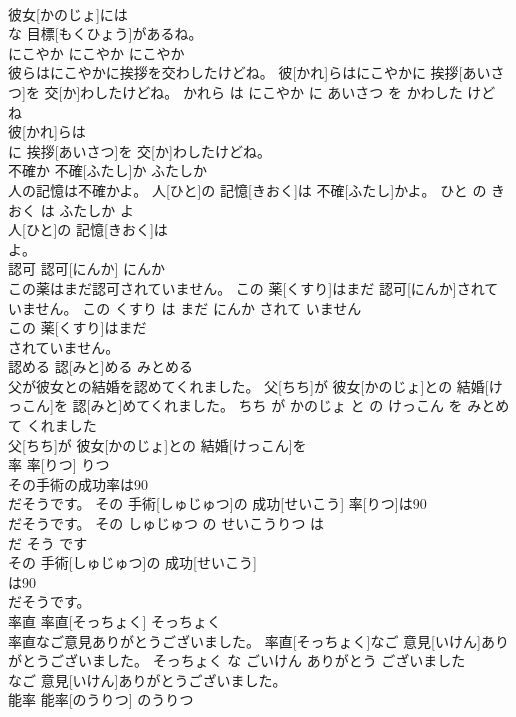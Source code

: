 \documentclass[8pt]{extreport}
\begin{document}
\begin{CJK}{UTF8}{min}
\\	彼女[かのじょ]には
\\	な 目標[もくひょう]があるね。			
\\	にこやか	にこやか	にこやか	
\\	彼らはにこやかに挨拶を交わしたけどね。	彼[かれ]らはにこやかに 挨拶[あいさつ]を 交[か]わしたけどね。	かれら は にこやか に あいさつ を かわした けど ね	
\\	彼[かれ]らは
\\	に 挨拶[あいさつ]を 交[か]わしたけどね。			
\\	不確か	不確[ふたし]か	ふたしか	
\\	人の記憶は不確かよ。	人[ひと]の 記憶[きおく]は 不確[ふたし]かよ。	ひと の きおく は ふたしか よ	
\\	人[ひと]の 記憶[きおく]は
\\	よ。			
\\	認可	認可[にんか]	にんか	
\\	この薬はまだ認可されていません。	この 薬[くすり]はまだ 認可[にんか]されていません。	この くすり は まだ にんか されて いません	
\\	この 薬[くすり]はまだ
\\	されていません。			
\\	認める	認[みと]める	みとめる	
\\	父が彼女との結婚を認めてくれました。	父[ちち]が 彼女[かのじょ]との 結婚[けっこん]を 認[みと]めてくれました。	ちち が かのじょ と の けっこん を みとめて くれました	
\\	父[ちち]が 彼女[かのじょ]との 結婚[けっこん]を
\\	率	率[りつ]	りつ	
\\	その手術の成功率は90
\\	だそうです。	その 手術[しゅじゅつ]の 成功[せいこう] 率[りつ]は90
\\	だそうです。	その しゅじゅつ の せいこうりつ は 
\\	だ そう です	
\\	その 手術[しゅじゅつ]の 成功[せいこう]
\\	は90
\\	だそうです。			
\\	率直	率直[そっちょく]	そっちょく	
\\	率直なご意見ありがとうございました。	率直[そっちょく]なご 意見[いけん]ありがとうございました。	そっちょく な ごいけん ありがとう ございました	
\\	なご 意見[いけん]ありがとうございました。			
\\	能率	能率[のうりつ]	のうりつ	

\end{CJK}
\end{document}
